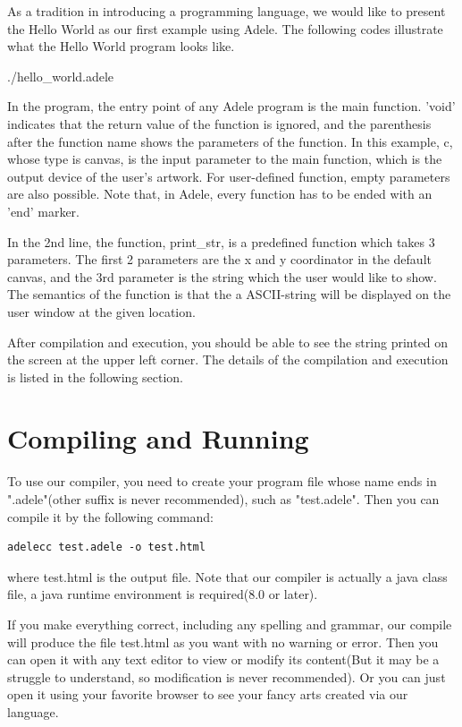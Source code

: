 \documentclass[11pt,letterpaper]{article}
\begin{document}
As a tradition in introducing a programming language, we would like to present the Hello World as our first example using Adele. The following codes illustrate what the Hello World program looks like.

 {./hello_world.adele}

In the program, the entry point of any Adele program is the main function. 'void' indicates that the return value of the function is ignored, and the parenthesis after the function name shows the parameters of the function. In this example, c, whose type is canvas, is the input parameter to the main function, which is the output device of the user's artwork. For user-defined function, empty parameters are also possible. Note that, in Adele, every function has to be ended with an 'end' marker.

In the 2nd line, the function, print\_str, is a predefined function which takes 3 parameters. The first 2 parameters are the x and y coordinator in the default canvas, and the 3rd parameter is the string which the user would like to show. The semantics of the function is that the a ASCII-string will be displayed on the user window at the given location.

After compilation and execution, you should be able to see the string printed on the screen at the upper left corner. The details of the compilation and execution is listed in the following section.

\section {Compiling and Running}
To use our compiler, you need to create your program file whose name ends in ".adele"(other suffix is never recommended), such as "test.adele". Then you can compile it by the following command:

\begin{lstlisting}[tabsize=4]
	adelecc test.adele -o test.html
\end{lstlisting}

where test.html is the output file. Note that our compiler is actually a java class file, a java runtime environment is required(8.0 or later).

If you make everything correct, including any spelling and grammar, our compile will produce the file test.html as you want with no warning or error. Then you can open it with any text editor to view or modify its content(But it may be a struggle to understand, so modification is never recommended). Or you can just open it using your favorite browser to see your fancy arts created via our language.
\end{document}
